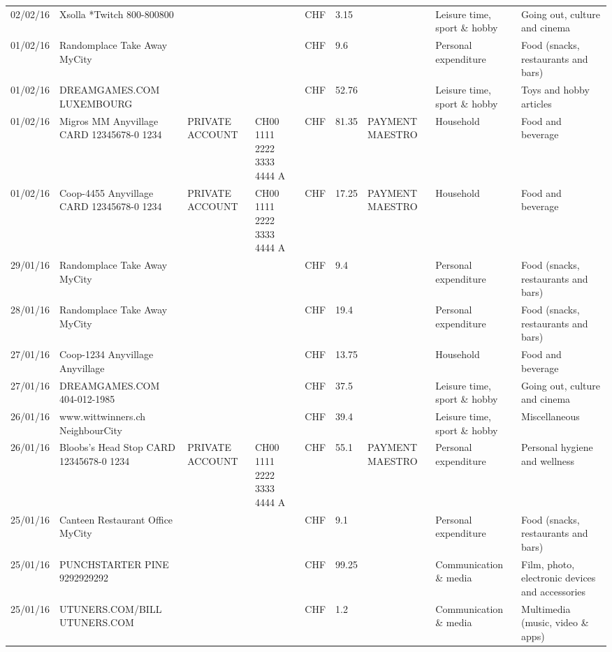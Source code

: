 \begin{landscape}
\begin{table}[t]
\begin{center}
\begin{tabular}{lllllllll}
		02/02/16 & Xsolla *Twitch           800-800800 &       &       & CHF   & 3.15  &       & Leisure time, sport \& hobby & Going out, culture and cinema \\
		01/02/16 & Randomplace Take Away     MyCity &       &       & CHF   & 9.6   &       & Personal expenditure & Food (snacks, restaurants and bars) \\
		01/02/16 & DREAMGAMES.COM           LUXEMBOURG &       &       & CHF   & 52.76 &       & Leisure time, sport \& hobby & Toys and hobby articles \\
		01/02/16 & Migros MM Anyvillage CARD 12345678-0 1234 & PRIVATE ACCOUNT & CH00 1111 2222 3333 4444 A & CHF   & 81.35 & PAYMENT MAESTRO & Household & Food and beverage \\
		01/02/16 & Coop-4455 Anyvillage CARD 12345678-0 1234 & PRIVATE ACCOUNT & CH00 1111 2222 3333 4444 A & CHF   & 17.25 & PAYMENT MAESTRO & Household & Food and beverage \\
		29/01/16 & Randomplace Take Away     MyCity &       &       & CHF   & 9.4   &       & Personal expenditure & Food (snacks, restaurants and bars) \\
		28/01/16 & Randomplace Take Away     MyCity &       &       & CHF   & 19.4  &       & Personal expenditure & Food (snacks, restaurants and bars) \\
		27/01/16 & Coop-1234 Anyvillage    Anyvillage &       &       & CHF   & 13.75 &       & Household & Food and beverage \\
		27/01/16 & DREAMGAMES.COM           404-012-1985 &       &       & CHF   & 37.5  &       & Leisure time, sport \& hobby & Going out, culture and cinema \\
		26/01/16 & www.wittwinners.ch        NeighbourCity &       &       & CHF   & 39.4  &       & Leisure time, sport \& hobby & Miscellaneous \\
		26/01/16 & Bloobs's Head Stop CARD 12345678-0 1234 & PRIVATE ACCOUNT & CH00 1111 2222 3333 4444 A & CHF   & 55.1  & PAYMENT MAESTRO & Personal expenditure & Personal hygiene and wellness \\
		25/01/16 & Canteen Restaurant Office      MyCity &       &       & CHF   & 9.1   &       & Personal expenditure & Food (snacks, restaurants and bars) \\
		25/01/16 & PUNCHSTARTER PINE   9292929292 &       &       & CHF   & 99.25 &       & Communication \& media & Film, photo, electronic devices and accessories \\
		25/01/16 & UTUNERS.COM/BILL          UTUNERS.COM &       &       & CHF   & 1.2   &       & Communication \& media & Multimedia (music, video \& apps) \\

\end{tabular}
\end{center}
\end{table}
\end{landscape}
